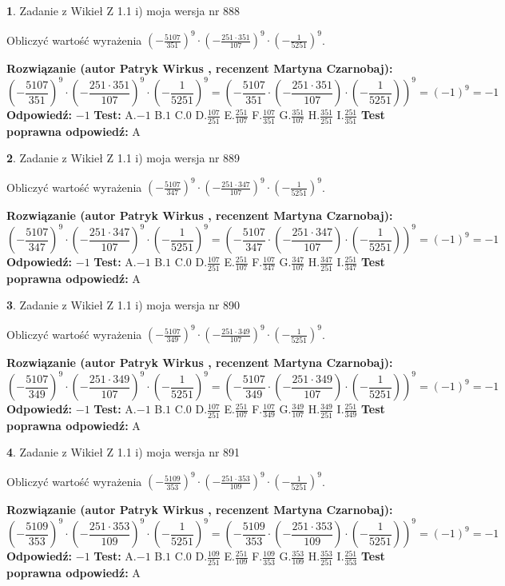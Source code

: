 \documentclass[12pt, a4paper]{article}
\theoremstyle{definition} %
\newtheorem{zad}{}
\newcommand{\zadStart}[1]{\begin{zad}#1\newline}
\newcommand{\zadStop}{\end{zad}}
\newcommand{\rozwStart}[2]{\noindent \textbf{Rozwiązanie (autor #1 , recenzent #2): }\newline}
\newcommand{\rozwStop}{\newline}
\newcommand{\odpStart}{\noindent \textbf{Odpowiedź:}\newline}
\newcommand{\odpStop}{\newline}
\newcommand{\testStart}{\noindent \textbf{Test:}\newline}
\newcommand{\testStop}{\newline}
\newcommand{\kluczStart}{\noindent \textbf{Test poprawna odpowiedź:}\newline}
\newcommand{\kluczStop}{\newline}
\begin{document}
\zadStart{Zadanie z Wikieł Z 1.1 i) moja wersja nr 888}

Obliczyć wartość wyrażenia $(-\frac{5107}{351})^{9} \cdot (-\frac{251 \cdot 351}{107})^{9} \cdot (-\frac{1}{5251})^{9}$.
\zadStop
\rozwStart{Patryk Wirkus}{Martyna Czarnobaj}
$$(-\frac{5107}{351})^{9} \cdot (-\frac{251 \cdot 351}{107})^{9} \cdot (-\frac{1}{5251})^{9} = (-\frac{5107}{351} \cdot (-\frac{251 \cdot 351}{107}) \cdot (-\frac{1}{5251}))^{9} = (-1)^{9} = -1$$
\rozwStop
\odpStart
$-1$
\odpStop
\testStart
A.$-1$ B.$1$ C.$0$ D.$\frac{107}{251}$ E.$\frac{251}{107}$
F.$\frac{107}{351}$ G.$\frac{351}{107}$
H.$\frac{351}{251}$
I.$\frac{251}{351}$
\testStop
\kluczStart
A
\kluczStop



\zadStart{Zadanie z Wikieł Z 1.1 i) moja wersja nr 889}

Obliczyć wartość wyrażenia $(-\frac{5107}{347})^{9} \cdot (-\frac{251 \cdot 347}{107})^{9} \cdot (-\frac{1}{5251})^{9}$.
\zadStop
\rozwStart{Patryk Wirkus}{Martyna Czarnobaj}
$$(-\frac{5107}{347})^{9} \cdot (-\frac{251 \cdot 347}{107})^{9} \cdot (-\frac{1}{5251})^{9} = (-\frac{5107}{347} \cdot (-\frac{251 \cdot 347}{107}) \cdot (-\frac{1}{5251}))^{9} = (-1)^{9} = -1$$
\rozwStop
\odpStart
$-1$
\odpStop
\testStart
A.$-1$ B.$1$ C.$0$ D.$\frac{107}{251}$ E.$\frac{251}{107}$
F.$\frac{107}{347}$ G.$\frac{347}{107}$
H.$\frac{347}{251}$
I.$\frac{251}{347}$
\testStop
\kluczStart
A
\kluczStop



\zadStart{Zadanie z Wikieł Z 1.1 i) moja wersja nr 890}

Obliczyć wartość wyrażenia $(-\frac{5107}{349})^{9} \cdot (-\frac{251 \cdot 349}{107})^{9} \cdot (-\frac{1}{5251})^{9}$.
\zadStop
\rozwStart{Patryk Wirkus}{Martyna Czarnobaj}
$$(-\frac{5107}{349})^{9} \cdot (-\frac{251 \cdot 349}{107})^{9} \cdot (-\frac{1}{5251})^{9} = (-\frac{5107}{349} \cdot (-\frac{251 \cdot 349}{107}) \cdot (-\frac{1}{5251}))^{9} = (-1)^{9} = -1$$
\rozwStop
\odpStart
$-1$
\odpStop
\testStart
A.$-1$ B.$1$ C.$0$ D.$\frac{107}{251}$ E.$\frac{251}{107}$
F.$\frac{107}{349}$ G.$\frac{349}{107}$
H.$\frac{349}{251}$
I.$\frac{251}{349}$
\testStop
\kluczStart
A
\kluczStop



\zadStart{Zadanie z Wikieł Z 1.1 i) moja wersja nr 891}

Obliczyć wartość wyrażenia $(-\frac{5109}{353})^{9} \cdot (-\frac{251 \cdot 353}{109})^{9} \cdot (-\frac{1}{5251})^{9}$.
\zadStop
\rozwStart{Patryk Wirkus}{Martyna Czarnobaj}
$$(-\frac{5109}{353})^{9} \cdot (-\frac{251 \cdot 353}{109})^{9} \cdot (-\frac{1}{5251})^{9} = (-\frac{5109}{353} \cdot (-\frac{251 \cdot 353}{109}) \cdot (-\frac{1}{5251}))^{9} = (-1)^{9} = -1$$
\rozwStop
\odpStart
$-1$
\odpStop
\testStart
A.$-1$ B.$1$ C.$0$ D.$\frac{109}{251}$ E.$\frac{251}{109}$
F.$\frac{109}{353}$ G.$\frac{353}{109}$
H.$\frac{353}{251}$
I.$\frac{251}{353}$
\testStop
\kluczStart
A
\kluczStop
\end{document}
